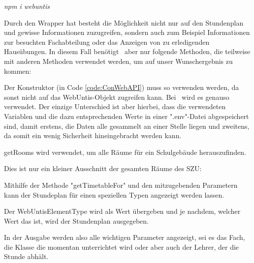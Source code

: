\emph{npm i webuntis}

Durch den Wrapper hat besteht die Möglichkeit nicht nur auf den Stundenplan und gewisse Informationen zuzugreifen, sondern auch zum Beispiel Informationen zur besuchten Fachabteilung oder das Anzeigen von zu erledigenden Hausübungen. In diesem Fall benötigt \ZELIA\ aber nur folgende Methoden, die teilweise mit anderen Methoden verwendet werden, um auf unser Wunschergebnis zu kommen:



Der Konstruktor (in Code \ref{code:ConWebAPI}) muss so verwenden werden, da sonst nicht auf das WebUntis-Objekt zugreifen kann. Bei \ZELIA\ wird es genauso verwendet. Der einzige Unterschied ist aber hierbei, dass die verwendeten Variablen und die dazu entsprechenden Werte in einer ".env"-Datei abgespeichert sind, damit erstens, die Daten alle gesammelt an einer Stelle liegen und zweitens, da somit ein wenig Sicherheit hineingebracht werden kann.


getRooms wird verwendet, um alle Räume für ein Schulgebäude herauszufinden.

\begin{minipage}{\textwidth}
    Dies ist nur ein kleiner Ausschnitt der gesamten Räume des SZU:
    
\end{minipage}

\begin{minipage}\textwidth
    Mithilfe der Methode "getTimetableFor" und den mitzugebenden Parametern kann der Stundeplan für einen speziellen Typen angezeigt werden lassen.
    
\end{minipage}


Der WebUntisElementType wird als Wert übergeben und je nachdem, welcher Wert das ist, wird der Stundenplan ausgegeben. 


In der Ausgabe werden also alle wichtigen Parameter angezeigt, sei es das Fach, die Klasse die momentan unterrichtet wird oder aber auch der Lehrer, der die Stunde abhält.

